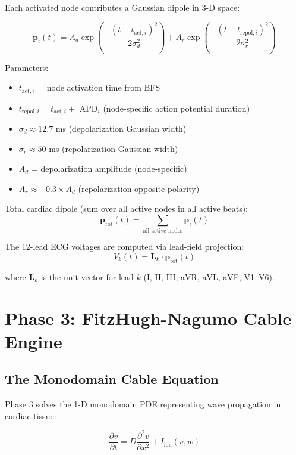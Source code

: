 \documentclass[12pt]{book}
\begin{document}
Each activated node contributes a Gaussian dipole in 3-D space:

\begin{equation}
\mathbf{p}_i(t) = A_d \exp\left(-\frac{(t - t_{\text{act},i})^2}{2\sigma_d^2}\right) + A_r \exp\left(-\frac{(t - t_{\text{repol},i})^2}{2\sigma_r^2}\right)
\end{equation}

Parameters:
\begin{itemize}
  \item $t_{\text{act},i}$ = node activation time from BFS
  \item $t_{\text{repol},i} = t_{\text{act},i} +$ APD$_i$ (node-specific action potential duration)
  \item $\sigma_d \approx 12.7$ ms (depolarization Gaussian width)
  \item $\sigma_r \approx 50$ ms (repolarization Gaussian width)
  \item $A_d$ = depolarization amplitude (node-specific)
  \item $A_r \approx -0.3 \times A_d$ (repolarization opposite polarity)
\end{itemize}

Total cardiac dipole (sum over all active nodes in all active beats):
$$\mathbf{p}_{\text{tot}}(t) = \sum_{\text{all active nodes}} \mathbf{p}_i(t)$$

The 12-lead ECG voltages are computed via lead-field projection:
$$V_k(t) = \mathbf{L}_k \cdot \mathbf{p}_{\text{tot}}(t)$$

where $\mathbf{L}_k$ is the unit vector for lead $k$ (I, II, III, aVR, aVL, aVF, V1--V6).


\chapter{Phase 3: FitzHugh-Nagumo Cable Engine}

\section{The Monodomain Cable Equation}

Phase 3 solves the 1-D monodomain PDE representing wave propagation in cardiac tissue:

\begin{equation}
\frac{\partial v}{\partial t} = D \frac{\partial^2 v}{\partial x^2} + I_{\text{ion}}(v, w)
\end{equation}
\end{document}

